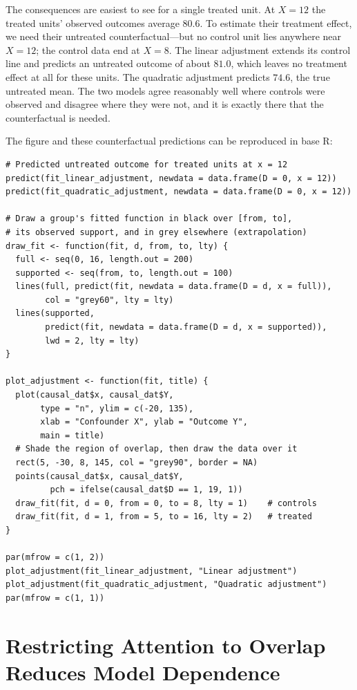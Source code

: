 \documentclass[11pt]{report}
\begin{document}
The consequences are easiest to see for a single treated unit. At \(X=12\) the treated units' observed outcomes average \(80.6\). To estimate their treatment effect, we need their untreated counterfactual---but no control unit lies anywhere near \(X=12\); the control data end at \(X=8\). The linear adjustment extends its control line and predicts an untreated outcome of about \(81.0\), which leaves no treatment effect at all for these units. The quadratic adjustment predicts \(74.6\), the true untreated mean. The two models agree reasonably well where controls were observed and disagree where they were not, and it is exactly there that the counterfactual is needed.

The figure and these counterfactual predictions can be reproduced in base R:

\begin{lstlisting}
# Predicted untreated outcome for treated units at x = 12
predict(fit_linear_adjustment, newdata = data.frame(D = 0, x = 12))
predict(fit_quadratic_adjustment, newdata = data.frame(D = 0, x = 12))

# Draw a group's fitted function in black over [from, to],
# its observed support, and in grey elsewhere (extrapolation)
draw_fit <- function(fit, d, from, to, lty) {
  full <- seq(0, 16, length.out = 200)
  supported <- seq(from, to, length.out = 100)
  lines(full, predict(fit, newdata = data.frame(D = d, x = full)),
        col = "grey60", lty = lty)
  lines(supported,
        predict(fit, newdata = data.frame(D = d, x = supported)),
        lwd = 2, lty = lty)
}

plot_adjustment <- function(fit, title) {
  plot(causal_dat$x, causal_dat$Y,
       type = "n", ylim = c(-20, 135),
       xlab = "Confounder X", ylab = "Outcome Y",
       main = title)
  # Shade the region of overlap, then draw the data over it
  rect(5, -30, 8, 145, col = "grey90", border = NA)
  points(causal_dat$x, causal_dat$Y,
         pch = ifelse(causal_dat$D == 1, 19, 1))
  draw_fit(fit, d = 0, from = 0, to = 8, lty = 1)    # controls
  draw_fit(fit, d = 1, from = 5, to = 16, lty = 2)   # treated
}

par(mfrow = c(1, 2))
plot_adjustment(fit_linear_adjustment, "Linear adjustment")
plot_adjustment(fit_quadratic_adjustment, "Quadratic adjustment")
par(mfrow = c(1, 1))
\end{lstlisting}

\section{Restricting Attention to Overlap Reduces Model Dependence}
\end{document}
